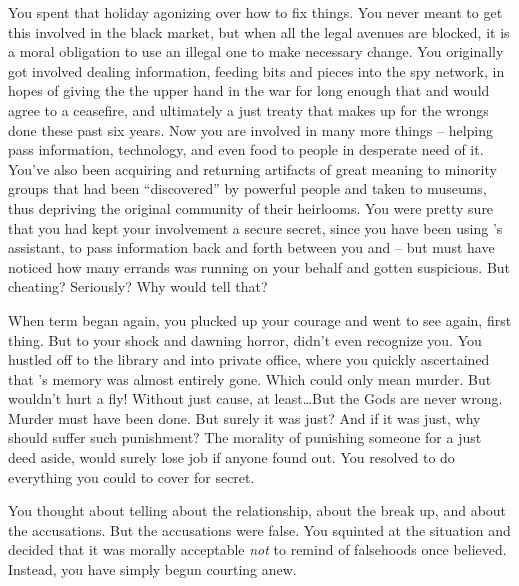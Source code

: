 \documentclass[char]{GL2020}
\begin{document}
You spent that holiday agonizing over how to fix things. You never meant to get this involved in the black market, but when all the legal avenues are blocked, it is a moral obligation to use an illegal one to make necessary change. You originally got involved dealing information, feeding bits and pieces into the \pShip{} spy network, in hopes of giving the \pShippies{} the upper hand in the war for long enough that \pFarm{} and \pTech{} would agree to a ceasefire, and ultimately a just treaty that makes up for the wrongs done these past six years. Now you are involved in many more things -- helping pass information, technology, and even food to people in desperate need of it. You’ve also been acquiring and returning artifacts of great meaning to minority groups that had been ``discovered'' by powerful people and taken to museums, thus depriving the original community of their heirlooms. You were pretty sure that you had kept your involvement a secure secret, since you have been using \cLibrarian{}’s assistant, \cLibAssist{} to pass information back and forth between you and \cChupSecond{} -- but \cLibrarian{} must have noticed how many errands \cLibAssist{} was running on your behalf and gotten suspicious. But cheating? Seriously? Why would \cChupAvenger{} tell \cLibrarian{} that?

When term began again, you plucked up your courage and went to see \cLibrarian{} again, first thing. But to your shock and dawning horror, \cLibrarian{\They} didn’t even recognize you. You hustled \cLibrarian{\them} off to the library and into \cLibrarian{\their} private office, where you quickly ascertained that \cLibrarian{}’s memory was almost entirely gone. Which could only mean murder. But \cLibrarian{} wouldn’t hurt a fly! Without just cause, at least\ldots But the Gods are never wrong. Murder must have been done. But surely it was just? And if it was just, why should \cLibrarian{} suffer such punishment? The morality of punishing someone for a just deed aside, \cLibrarian{} would surely lose \cLibrarian{\their} job if anyone found out. You resolved to do everything you could to cover for \cLibrarian{\their} secret.

You thought about telling \cLibrarian{} about the relationship, about the break up, and about the accusations. But the accusations were false. You squinted at the situation and decided that it was morally acceptable \emph{not} to remind \cLibrarian{} of falsehoods \cLibrarian{\they} once believed. Instead, you have simply begun courting \cLibrarian{} anew.
\end{document}

